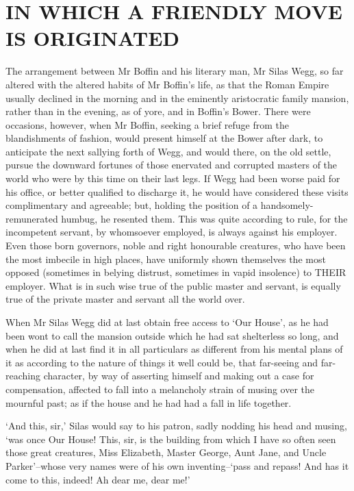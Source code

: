 
\chapter{IN WHICH A FRIENDLY MOVE IS ORIGINATED}

The arrangement between Mr Boffin and his literary man, Mr Silas Wegg,
so far altered with the altered habits of Mr Boffin’s life, as that
the Roman Empire usually declined in the morning and in the eminently
aristocratic family mansion, rather than in the evening, as of yore,
and in Boffin’s Bower. There were occasions, however, when Mr Boffin,
seeking a brief refuge from the blandishments of fashion, would present
himself at the Bower after dark, to anticipate the next sallying
forth of Wegg, and would there, on the old settle, pursue the downward
fortunes of those enervated and corrupted masters of the world who were
by this time on their last legs. If Wegg had been worse paid for his
office, or better qualified to discharge it, he would have considered
these visits complimentary and agreeable; but, holding the position of
a handsomely-remunerated humbug, he resented them. This was quite
according to rule, for the incompetent servant, by whomsoever employed,
is always against his employer. Even those born governors, noble and
right honourable creatures, who have been the most imbecile in high
places, have uniformly shown themselves the most opposed (sometimes in
belying distrust, sometimes in vapid insolence) to THEIR employer. What
is in such wise true of the public master and servant, is equally true
of the private master and servant all the world over.

When Mr Silas Wegg did at last obtain free access to ‘Our House’, as he
had been wont to call the mansion outside which he had sat shelterless
so long, and when he did at last find it in all particulars as different
from his mental plans of it as according to the nature of things it
well could be, that far-seeing and far-reaching character, by way of
asserting himself and making out a case for compensation, affected to
fall into a melancholy strain of musing over the mournful past; as if
the house and he had had a fall in life together.

‘And this, sir,’ Silas would say to his patron, sadly nodding his head
and musing, ‘was once Our House! This, sir, is the building from which I
have so often seen those great creatures, Miss Elizabeth, Master
George, Aunt Jane, and Uncle Parker’--whose very names were of his own
inventing--‘pass and repass! And has it come to this, indeed! Ah dear
me, dear me!’

